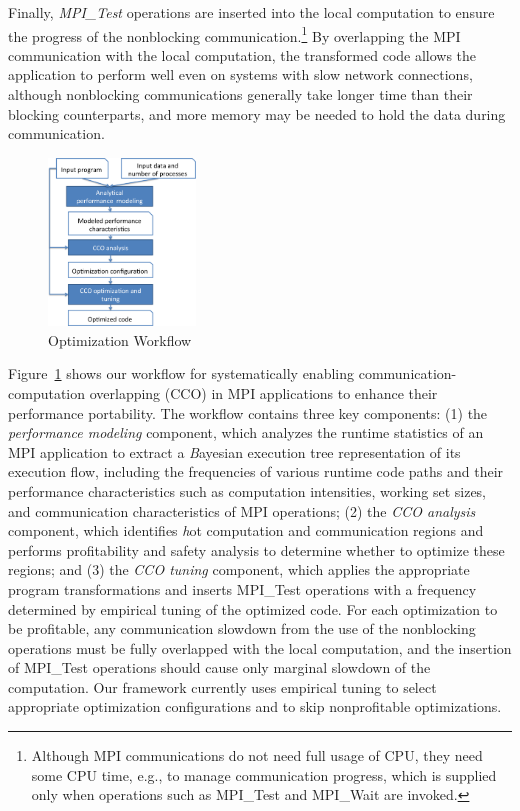 Finally, \emph{MPI\_Test} operations are inserted into the local computation to
ensure the progress of the nonblocking
communication.\footnote{Although MPI communications do not need full
  usage of CPU, they need some CPU time, e.g., to manage communication
  progress, which is supplied only when operations such as MPI\_Test
  and MPI\_Wait are invoked.}  By overlapping the MPI communication
with the local computation, the transformed code allows the
application to perform well even on systems with slow network
connections, although nonblocking communications generally take longer
time than their blocking counterparts, and more memory may be needed to
hold the data during communication.

\begin{figure}[h]
\centering
\includegraphics[width=0.35\textwidth]{fig/framework.png} %
\caption{Optimization Workflow}
\label{fig:overview}
\end{figure}

Figure~\ref{fig:overview} shows our workflow for systematically
enabling communication-computation overlapping (CCO) in MPI
applications to enhance their performance portability.  The
workflow contains three key components: (1) the \emph{performance
  modeling} component, which analyzes the runtime statistics of an MPI
application to extract a {\emph Bayesian execution
  tree\cite{jichi:ipdps14}} representation of its execution flow,
including the frequencies of various runtime code paths and their
performance characteristics such as computation intensities, working
set sizes, and communication characteristics of MPI operations; (2)
the \emph{CCO analysis} component, which identifies {\emph hot}
computation and communication regions
and performs profitability and safety
analysis to determine whether to optimize these regions; and (3) the \emph{CCO
  tuning} component, which applies the appropriate program
transformations
and inserts MPI\_Test operations with a frequency
determined by empirical tuning of the optimized code.
For each optimization to be profitable, any
communication slowdown from the use of the nonblocking operations must
be fully overlapped with the local computation, and the insertion of
MPI\_Test operations should cause only marginal slowdown of the computation.
Our framework currently
uses empirical tuning to select appropriate
optimization configurations and to skip nonprofitable optimizations.

